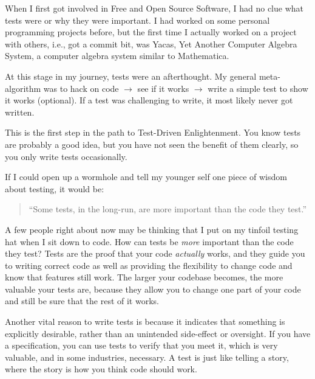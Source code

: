 

\noindent{}When I first got involved in Free and Open Source Software, I had no clue what
tests were or why they were important. I had worked on some personal programming
projects before, but the first time I actually worked on a project with others,
i.e., got a commit bit, was Yacas, Yet Another Computer Algebra System, a computer algebra system similar to Mathematica.

At this stage in my journey, tests were an afterthought. My general
meta-algorithm was to hack on code $\rightarrow$ see if it works $\rightarrow$
write a simple test to show it works (optional). If a test was challenging to
write, it most likely never got written.

This is the first step in the path to Test-Driven Enlightenment. You know tests
are probably a good idea, but you have not seen the benefit of them clearly, so
you only write tests occasionally.

If I could open up a wormhole and tell my younger self one piece of wisdom about
testing, it would be:
\begin{quote}``Some tests, in the long-run, are more important than the code
they test.''\end{quote}

A few people right about now may be thinking that I put on my tinfoil testing
hat when I sit down to code. How can tests be \emph{more} important than the
code they test? Tests are the proof that your code \emph{actually} works, and
they guide you to writing correct code as well as providing the flexibility to
change code and know that features still work. The larger your codebase becomes,
the more valuable your tests are, because they allow you to change one part of
your code and still be sure that the rest of it works.

Another vital reason to write tests is because it indicates that something is
explicitly desirable, rather than an unintended side-effect or oversight. If you
have a specification, you can use tests to verify that you meet it, which is
very valuable, and in some industries, necessary. A test is just like telling a
story, where the story is how you think code should work.

